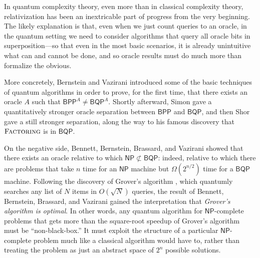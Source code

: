 \documentclass[10pt,a4paper]{article}
\begin{document}
In quantum complexity theory, even more than in classical complexity theory, relativization has been an inextricable part of progress from the very beginning.  The likely explanation is that, even when we just count queries to an oracle, in the quantum setting we need to consider algorithms that query all oracle bits in superposition---so that even in the most basic scenarios, it is already unintuitive what can and cannot be done, and so oracle results must do much more than formalize the obvious.

More concretely, Bernstein and Vazirani \cite{BV97} introduced some of the basic techniques of quantum algorithms in order to prove, for the first time, that there exists an oracle $A$ such that $\mathsf{BPP}^A \neq \mathsf{BQP}^A$. Shortly afterward, Simon \cite{Sim97} gave a quantitatively stronger oracle
separation between $\mathsf{BPP}$ and $\mathsf{BQP}$, and then Shor \cite{Sho99} gave a still stronger separation, along the way to his famous discovery that $\textsc{Factoring}$ is in $\mathsf{BQP}$.

On the negative side, Bennett, Bernstein, Brassard, and Vazirani \cite{BBBV97} showed that there exists an oracle relative to which $\mathsf{NP} \not\subset \mathsf{BQP}$: indeed, relative to which there are problems that take $n$ time for an $\mathsf{NP}$ machine but $\Omega\left(2^{n/2}\right)$ time for a $\mathsf{BQP}$ machine.  Following the discovery of Grover's algorithm \cite{Gro96}, which quantumly searches any list of $N$ items in $O\left(\sqrt{N}\right)$ queries, the result of Bennett, Bernstein, Brassard, and Vazirani gained the interpretation that \textit{Grover's algorithm is optimal}.  In other words, any quantum algorithm for $\mathsf{NP}$-complete problems that gets more than the square-root speedup of Grover's algorithm must be ``non-black-box.''  It must exploit the structure of a particular $\mathsf{NP}$-complete problem much like a classical algorithm would have to, rather than treating the problem as just an abstract space of $2^n$ possible solutions.
\end{document}
